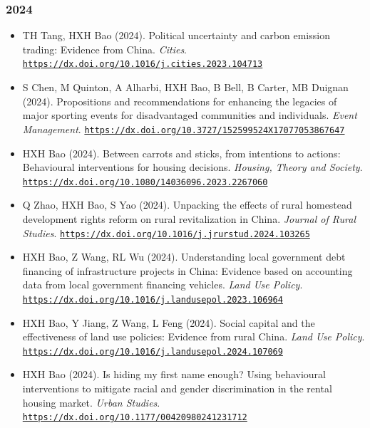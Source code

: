 \documentclass[11pt,a4paper]{article}
\providecommand{\tightlist}{%
  \setlength{\itemsep}{1pt}\setlength{\parskip}{0pt}}
\begin{document}
\subsubsection{2024}\label{section-2}

\begin{itemize}
\tightlist
\item
  TH Tang, HXH Bao (2024). Political uncertainty and carbon emission
  trading: Evidence from China. \emph{Cities}.
  \href{https://dx.doi.org/10.1016/j.cities.2023.104713}{\nolinkurl{https://dx.doi.org/10.1016/j.cities.2023.104713}}
\item
  S Chen, M Quinton, A Alharbi, HXH Bao, B Bell, B Carter, MB Duignan
  (2024). Propositions and recommendations for enhancing the legacies of
  major sporting events for disadvantaged communities and individuals.
  \emph{Event Management}.
  \href{https://dx.doi.org/10.3727/152599524X17077053867647}{\nolinkurl{https://dx.doi.org/10.3727/152599524X17077053867647}}
\item
  HXH Bao (2024). Between carrots and sticks, from intentions to
  actions: Behavioural interventions for housing decisions.
  \emph{Housing, Theory and Society}.
  \href{https://dx.doi.org/10.1080/14036096.2023.2267060}{\nolinkurl{https://dx.doi.org/10.1080/14036096.2023.2267060}}
\item
  Q Zhao, HXH Bao, S Yao (2024). Unpacking the effects of rural
  homestead development rights reform on rural revitalization in China.
  \emph{Journal of Rural Studies}.
  \href{https://dx.doi.org/10.1016/j.jrurstud.2024.103265}{\nolinkurl{https://dx.doi.org/10.1016/j.jrurstud.2024.103265}}
\item
  HXH Bao, Z Wang, RL Wu (2024). Understanding local government debt
  financing of infrastructure projects in China: Evidence based on
  accounting data from local government financing vehicles. \emph{Land
  Use Policy}.
  \href{https://dx.doi.org/10.1016/j.landusepol.2023.106964}{\nolinkurl{https://dx.doi.org/10.1016/j.landusepol.2023.106964}}
\item
  HXH Bao, Y Jiang, Z Wang, L Feng (2024). Social capital and the
  effectiveness of land use policies: Evidence from rural China.
  \emph{Land Use Policy}.
  \href{https://dx.doi.org/10.1016/j.landusepol.2024.107069}{\nolinkurl{https://dx.doi.org/10.1016/j.landusepol.2024.107069}}
\item
  HXH Bao (2024). Is hiding my first name enough? Using behavioural
  interventions to mitigate racial and gender discrimination in the
  rental housing market. \emph{Urban Studies}.
  \href{https://dx.doi.org/10.1177/00420980241231712}{\nolinkurl{https://dx.doi.org/10.1177/00420980241231712}}
\end{itemize}
\end{document}
